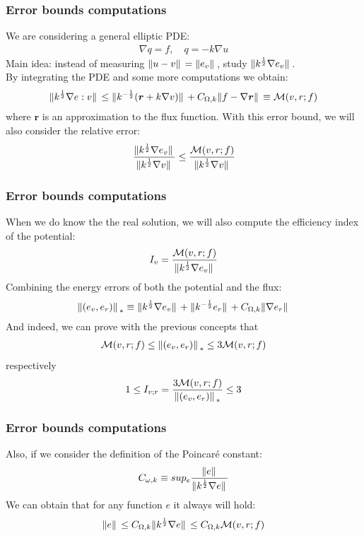 \documentclass[t]{beamer}
\begin{document}
\begin{frame}
\frametitle{Error bounds computations}
We are considering a general elliptic PDE:
\begin{align*}
\nabla q = f , \quad q =-k \nabla u
\end{align*}
Main idea: instead of measuring $\norm*{u-v} = \norm*{e_v}$, study $\norm*{k^{\frac{1}{2}}\nabla e_v}$. 
\\ By integrating the PDE and some more computations we obtain:
\begin{align*}
\norm*{k^{\frac{1}{2}}\nabla e:v} \leq \norm*{k^{-\frac{1}{2}}(\bm{r}+k\nabla v)} + C_{\Omega,k}\norm*{f-\nabla \bm{r}} \equiv \mathcal{M}(v,r;f)
\end{align*}
where $\bm{r}$ is an approximation to the flux function.
With this error bound, we will also consider the \alert{relative error}:
\begin{align*}
\frac{\norm*{k^{\frac{1}{2}}\nabla e_v}}{\norm*{k^{\frac{1}{2}}\nabla v}} \leq \frac{\mathcal{M}(v,r;f)}{\norm*{k^{\frac{1}{2}}\nabla v}}
\end{align*}

\end{frame}

\begin{frame}
\frametitle{Error bounds computations}
When we do know the the real solution, we will also compute the \alert{efficiency index of the potential}:
\begin{align*}
I_v = \frac{\mathcal{M}(v,r;f)}{\norm*{k^{\frac{1}{2}}\nabla e_v}}
\end{align*}
Combining the energy errors of both the potential and the flux:
\begin{align*}
\norm*{(e_v,e_r)}_{*} \equiv \norm*{k^{\frac{1}{2}}\nabla e_v} + \norm*{k^{-\frac{1}{2}}e_r} + C_{\Omega,k}\norm*{\nabla e_r}
\end{align*} 
And indeed, we can prove with the previous concepts that 
\begin{align*}
\mathcal{M}(v,r;f) \leq  \norm*{(e_v,e_r)}_{*}  \leq 3\mathcal{M}(v,r;f)
\end{align*}
respectively
\begin{align*}
	1 \leq I_{v;r} = \frac{3\mathcal{M}(v,r;f)}{\norm*{(e_v, e_r)}_*} \leq 3
\end{align*}
\end{frame}

\begin{frame}
	\frametitle{Error bounds computations}
	Also, if we consider the definition of the Poincaré constant:
	\begin{align*}
        C_{\omega,k} \equiv sup_e \frac{\norm*{e}}{\norm*{k^{\frac{1}{2}}\nabla{e}}}
    \end{align*}
    We can obtain that for any function $e$ it always will hold:
    \begin{align*}
        \norm*{e} \leq C_{\Omega,k}\norm*{k^{\frac{1}{2}}\nabla{e}} \leq C_{\Omega,k}\mathcal{M}(v,r;f)
    \end{align*}
\end{frame}
\end{document}
